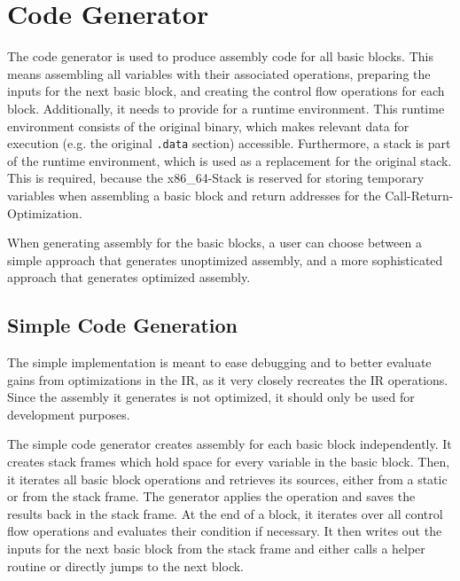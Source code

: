 \documentclass[course=eragp]{aspdoc}
\begin{document}
\section{Code Generator}\label{sec:generator}
The code generator is used to produce assembly code for all basic blocks. This means assembling all variables with their
associated operations, preparing the inputs for the next basic block, and creating the control flow operations for each
block.
Additionally, it needs to provide for a runtime environment. This runtime environment consists of the original binary,
which makes relevant data for execution (e.g. the original \texttt{.data} section) accessible. Furthermore, a stack is
part of the runtime environment, which is used as a replacement for the original stack. This is required, because the
x86\_64-Stack is reserved for storing temporary variables when assembling a basic block and return addresses for the
Call-Return-Optimization.

\par

When generating assembly for the basic blocks, a user can choose between a simple approach that generates unoptimized
assembly, and a more sophisticated approach that generates optimized assembly.

\subsection{Simple Code Generation}\label{naive_generator}

The simple implementation is meant to ease debugging and to better evaluate gains from optimizations in the IR, as it
very closely recreates the IR operations. Since the assembly it generates is not optimized, it should only be used for
development purposes.

\par

The simple code generator creates assembly for each basic block independently. It creates stack frames which hold space
for every variable in the basic block. Then, it iterates all basic block operations and retrieves its sources, either
from a static or from the stack frame. The generator applies the operation and saves the results back in the stack
frame. At the end of a block, it iterates over all control flow operations and evaluates their condition if necessary.
It then writes out the inputs for the next basic block from the stack frame and either calls a helper routine or
directly jumps to the next block.
\end{document}
